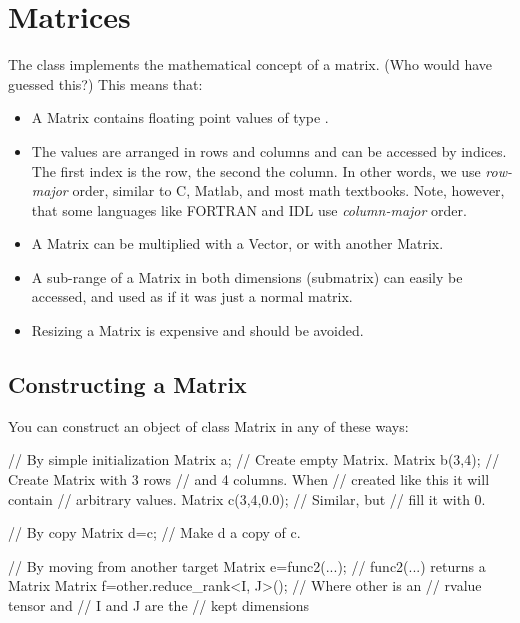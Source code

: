 \section{Matrices}
\label{sec:matpack:matrices}

The class  implements the mathematical concept of a
matrix. (Who would have guessed this?) This means that:
\begin{itemize}
\item A Matrix contains floating point values of type .
\item The values are arranged in rows and columns and can be accessed
  by indices. The first index is the row, the second the column. In
  other words, we use \emph{row-major} order, similar to C, Matlab,
  and most math textbooks. Note, however, that some languages like
  FORTRAN and IDL use \emph{column-major} order.
\item A Matrix can be multiplied with a Vector, or with another
  Matrix.
\item A sub-range of a Matrix in both dimensions (submatrix) can
  easily be accessed, and used as if it was just a normal matrix.
\item Resizing a Matrix is expensive and should be avoided.
\end{itemize}

\subsection{Constructing a Matrix}
You can construct an object of class Matrix in any of these ways:

\begin{code}
// By simple initialization
Matrix a;          // Create empty Matrix.
Matrix b(3,4);     // Create Matrix with 3 rows
                   // and 4 columns. When
                   // created like this it will contain
                   // arbitrary values.
Matrix c(3,4,0.0); // Similar, but
                   // fill it with 0.

// By copy
Matrix d=c;        // Make d a copy of c.

// By moving from another target
Matrix e=func2(...);  // func2(...) returns a Matrix
Matrix f=other.reduce_rank<I, J>();  // Where other is an
                                     // rvalue tensor and
                                     // I and J are the
                                     // kept dimensions
\end{code}

